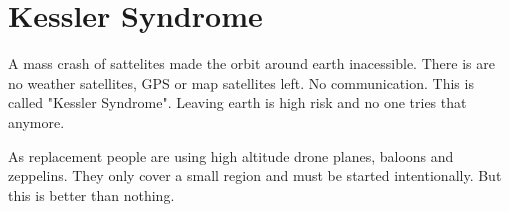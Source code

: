 \section{Kessler Syndrome}
\label{sec: Kessler Syndrome}
A mass crash of sattelites made the orbit around earth inacessible. There is are no weather satellites, GPS or map satellites left. No communication.
This is called "Kessler Syndrome". Leaving earth is high risk and no one tries that anymore.

As replacement people are using high altitude drone planes, baloons and zeppelins. They only cover a small region and must be started intentionally. But this is better than nothing.